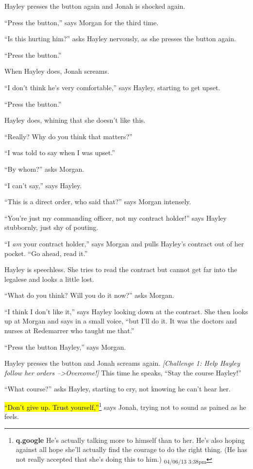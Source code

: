 Hayley presses the button again and Jonah is shocked again.

``Press the button,'' says Morgan for the third time.

``Is this hurting him?'' asks Hayley nervously, as she presses the button again.

``Press the button.''  

When Hayley does, Jonah screams.

``I don't think he's very comfortable,'' says Hayley, starting to get upset.

``Press the button.''

Hayley does, whining that she doesn't like this.

``Really?  Why do you think that matters?''

``I was told to say when I was upset.''

``By whom?'' asks Morgan.

``I can't say,'' says Hayley.

``This is a direct order, who said that?'' says Morgan intensely.

``You're just my commanding officer, not my contract holder!'' says Hayley stubbornly, just shy of pouting.

``I \textit{am} your contract holder,'' says Morgan and pulls Hayley's contract out of her pocket.  ``Go ahead, read it.''

Hayley is speechless.  She tries to read the contract but cannot get far into the legalese and looks a little lost.

``What do you think?  Will you do it now?'' asks Morgan.

``I think I don't like it,'' says Hayley looking down at the contract.  She then looks up at Morgan and says in a small voice, ``but I'll do it.  It was the doctors and nurses at Redemarrer who taught me that.''

``Press the button Hayley,'' says Morgan.

Hayley presses the button and Jonah screams again.  \textit{{[}Challenge 1: Help Hayley follow her orders --\textgreater Overcome!{]}} This time he speaks, ``Stay the course Hayley!''

``What course?'' asks Hayley, starting to cry, not knowing he can't hear her.

\hl{``Don't give up.  Trust yourself,''}\footnote{\textbf{q.google }He's actually talking more to himself than to her.  He's also hoping against all hope she'll actually find the courage to do the right thing.  (He has not really accepted that she's doing this to him.) \textsubscript{04/06/13 3:38pm}} says Jonah, trying not to sound as pained as he feels.

